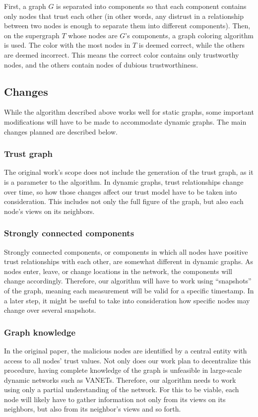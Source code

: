 \documentclass{article}
\begin{document}
First, a graph $G$ is separated into components so that each component contains only nodes that trust each other (in other words, any distrust in a relationship between two nodes is enough to separate them into different components).
Then, on the supergraph $T$ whose nodes are $G$'s components, a graph coloring algorithm is used.
The color with the most nodes in $T$ is deemed correct, while the others are deemed incorrect.
This means the correct color contains only trustworthy nodes, and the others contain nodes of dubious trustworthiness.

\subsection{Changes}
While the algorithm described above works well for static graphs, some important modifications will have to be made to accommodate dynamic graphs.
The main changes planned are described below.

\subsubsection{Trust graph}
The original work's scope does not include the generation of the trust graph, as it is a parameter to the algorithm.
In dynamic graphs, trust relationships change over time, so how those changes affect our trust model have to be taken into consideration.
This includes not only the full figure of the graph, but also each node's views on its neighbors.

\subsubsection{Strongly connected components}
Strongly connected components, or components in which all nodes have positive trust relationships with each other, are somewhat different in dynamic graphs.
As nodes enter, leave, or change locations in the network, the components will change accordingly.
Therefore, our algorithm will have to work using ``snapshots'' of the graph, meaning each measurement will be valid for a specific timestamp.
In a later step, it might be useful to take into consideration how specific nodes may change over several snapshots.

\subsubsection{Graph knowledge}
In the original paper, the malicious nodes are identified by a central entity with access to all nodes' trust values.
Not only does our work plan to decentralize this procedure, having complete knowledge of the graph is unfeasible in large-scale dynamic networks such as VANETs.
Therefore, our algorithm needs to work using only a partial understanding of the network.
For this to be viable, each node will likely have to gather information not only from its views on its neighbors, but also from its neighbor's views and so forth.
\end{document}
